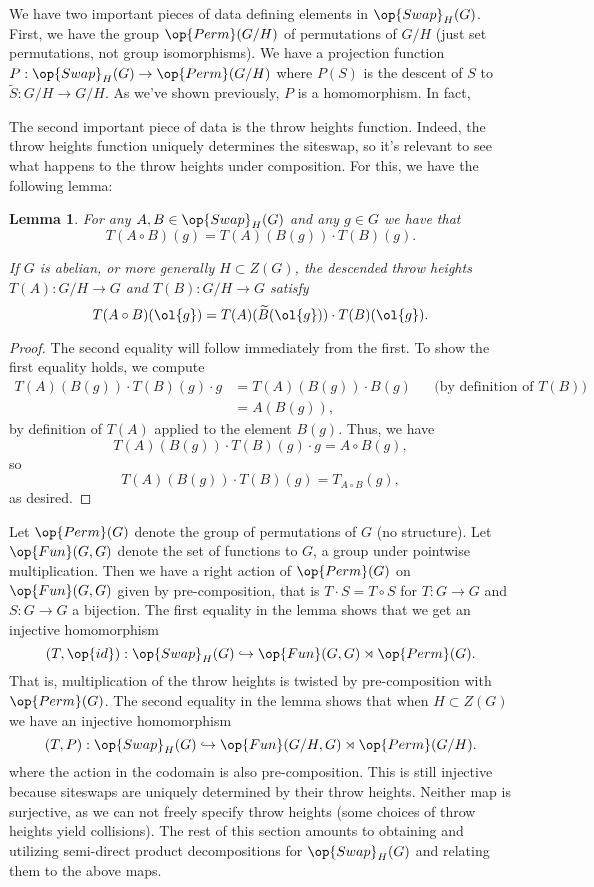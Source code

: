 \documentclass[12nt]{article}
\theoremstyle{plain}
\newtheorem{lemma}{Lemma}
\begin{document}
We have two important pieces of data defining elements in $\op{Swap}_H(G)$. First, we have the group $\op{Perm}(G/H)$ of permutations of $G/H$ (just set permutations, not group isomorphisms). We have a projection function $P : \op{Swap}_H(G) \to \op{Perm}(G/H)$ where $P(S)$ is the descent of $S$ to $\widetilde{S} : G/H \to G/H$. As we've shown previously, $P$ is a homomorphism. In fact, 

The second important piece of data is the throw heights function. Indeed, the throw heights function uniquely determines the siteswap, so it's relevant to see what happens to the throw heights under composition. For this, we have the following lemma:

\begin{lemma}
For any $A, B \in \op{Swap}_H(G)$ and any $g \in G$ we have that
\[
T(A \circ B)(g) = T(A)(B(g)) \cdot T(B)(g).
\]

If $G$ is abelian, or more generally $H \subset Z(G)$, the descended throw heights $T(A) : G/H \to G$ and $T(B) : G/H \to G$ satisfy
\[
T(A \circ B)(\ol{g}) = T(A)(\widetilde{B}(\ol{g})) \cdot T(B)(\ol{g}).
\]

\end{lemma}

\begin{proof}
The second equality will follow immediately from the first. To show the first equality holds, we compute
\begin{align*}
T(A)(B(g))\cdot T(B)(g) \cdot g &= T(A)(B(g))\cdot B(g) && \text{(by definition of $T(B)$)} \\
	&= A(B(g)),
\end{align*} 
by definition of $T(A)$ applied to the element $B(g)$. Thus, we have
\[
T(A)(B(g))\cdot T(B)(g) \cdot g = A \circ B(g),
\]
so 
\[
T(A)(B(g)) \cdot T(B)(g) = T_{A \circ B}(g),
\]
as desired.
\end{proof}

Let $\op{Perm}(G)$ denote the group of permutations of $G$ (no structure). Let $\op{Fun}(G, G)$ denote the set of functions to $G$, a group under pointwise multiplication. Then we have a right action of $\op{Perm}(G)$ on $\op{Fun}(G, G)$ given  by pre-composition, that is $T \cdot S = T \circ S$ for $T : G \to G$ and $S : G \to G$ a bijection. The first equality in the lemma shows that we get an injective homomorphism
\[
(T, \op{id}) : \op{Swap}_H(G) \hookrightarrow \op{Fun}(G, G) \rtimes \op{Perm}(G).
\]
That is, multiplication of the throw heights is twisted by pre-composition with $\op{Perm}(G)$. The second equality in the lemma shows that when $H \subset Z(G)$ we have an injective homomorphism
\[
(T, P) : \op{Swap}_H(G) \hookrightarrow \op{Fun}(G/H, G) \rtimes \op{Perm}(G/H).
\]
where the action in the codomain is also pre-composition. This is still injective because siteswaps are uniquely determined by their throw heights. Neither map is surjective, as we can not freely specify throw heights (some choices of throw heights yield collisions). The rest of this section amounts to obtaining and utilizing semi-direct product decompositions for $\op{Swap}_H(G)$ and relating them to the above maps.
\end{document}
